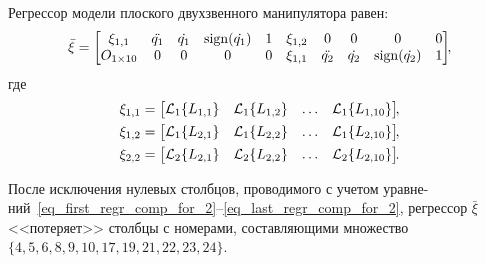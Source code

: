 \label{app_first_example_regressor}
Регрессор модели плоского двухзвенного манипулятора равен:
\begin{equation}
    \bar{\xi} =
    \begin{bmatrix}
        \xi_{1,1} & \ddot{q_1} & \dot{q_1} & \operatorname{sign}(\dot{q_1}) & 1 & \xi_{1,2} & 0 & 0 & 0 & 0\\
        O_{1\times10} & 0 & 0 & 0 & 0 & \xi_{1,1} & \ddot{q_2} & \dot{q_2} & \operatorname{sign}(\dot{q_2}) & 1
    \end{bmatrix}\!\!,
\end{equation}
где
\begin{gather}
    \xi_{1,1} =
    \begin{bmatrix}
        \mathcal{L}_1 \{L_{1,1}\} & \mathcal{L}_1 \{L_{1,2}\} & \ldots & \mathcal{L}_1 \{L_{1,10}\}
    \end{bmatrix}\!\!,
    \\
    \xi_{1,2} =
    \begin{bmatrix}
        \mathcal{L}_1 \{L_{2,1}\} & \mathcal{L}_1 \{L_{2,2}\} & \ldots & \mathcal{L}_1 \{L_{2,10}\}
    \end{bmatrix}\!\!,
    \\
    \xi_{2,2} =
    \begin{bmatrix}
        \mathcal{L}_2 \{L_{2,1}\} & \mathcal{L}_2 \{L_{2,2}\} & \ldots & \mathcal{L}_2 \{L_{2,10}\}
    \end{bmatrix}\!\!\ldotp
\end{gather}

После исключения нулевых столбцов, проводимого с учетом уравне-\linebreak %
ний~\eqref{eq_first_regr_comp_for_2}--\eqref{eq_last_regr_comp_for_2}, регрессор $\bar{\xi}$ <<потеряет>> столбцы с номерами, составляющими множество $\{4,5,6,8,9,10,17,19,21,22,23,24\}$.

